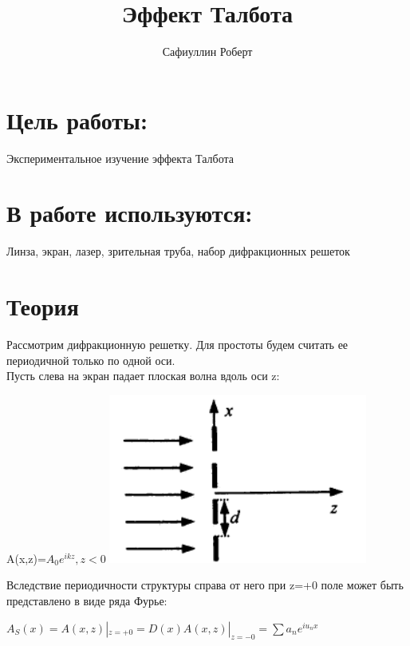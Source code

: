 \documentclass[a4paper,12pt]{article} %
\author{Сафиуллин Роберт	}
\title{Эффект Талбота}
\begin{document}

\maketitle


\newpage

\section{Цель работы:}
Экспериментальное изучение эффекта Талбота 
\\
\section{В работе используются:}
 Линза, экран, лазер, зрительная труба, набор дифракционных решеток
 
        \section{Теория}
        Рассмотрим дифракционную решетку. Для простоты будем считать ее периодичной только по одной оси. \\
        Пусть слева на экран падает плоская волна вдоль оси z: \\
\begin{center}

        A(x,z)=$A_0 e^{ikz}, z<0$  \includegraphics[scale=0.8]{ust}\\
        \end{center}        

        Вследствие периодичности структуры справа от него при z=+0 поле может быть представлено в виде ряда Фурье: \\
\begin{center}

        $A_S(x)=A(x,z)|_{z=+0}=D(x)A(x,z)|_{z=-0}=\sum a_n e^{iu_n x} $ \\
        \end{center}       
\end{document}
